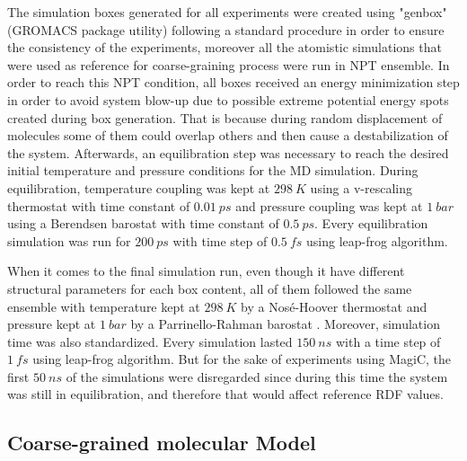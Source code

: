 \documentclass[10pt,a4paper,twoside]{article}
\begin{document}
The simulation boxes generated for all experiments were created using "genbox" (GROMACS package utility) following a standard procedure in order to ensure the consistency of the experiments, moreover all the atomistic simulations that were used as reference for coarse-graining process were run in NPT ensemble. In order to reach this NPT condition, all boxes received an energy minimization step in order to avoid system blow-up due to possible extreme potential energy spots created during box generation. That is because during random displacement of molecules some of them could overlap others and then cause a destabilization of the system. Afterwards, an equilibration step was necessary to reach the desired initial temperature and pressure conditions for the MD simulation. During equilibration, temperature coupling was kept at $298\ K$ using a v-rescaling thermostat \cite{vtstat} with time constant of $0.01\ ps$ and pressure coupling was kept at $1\ bar$ using a Berendsen barostat \cite{berend} with time constant of $0.5\ ps$.  Every equilibration simulation was run for $200\ ps$ with time step of $0.5\ fs$ using leap-frog algorithm.

 When it comes to the final simulation run, even though it have different structural parameters for each box content, all of them followed the same ensemble with temperature kept at $298\ K$ by a Nosé-Hoover thermostat \cite{nose} \cite{hoover} and pressure kept at $1\ bar$ by a Parrinello-Rahman barostat \cite{prbstat}. Moreover, simulation time was also standardized. Every simulation lasted $150\ ns$ with a time step of $1\ fs$ using leap-frog algorithm. But for the sake of experiments using MagiC, the first $50\ ns$ of the simulations were disregarded since during this time the system was still in equilibration, and therefore that would affect reference RDF values.
 
\subsection{Coarse-grained molecular Model}
\end{document}
